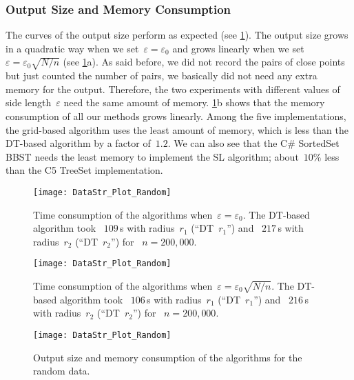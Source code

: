 \subsubsection{Output Size and Memory Consumption}
The curves of the output size perform as expected
(see \fig\ref{fig:DataStr_RandomMemory}). 
The output size grows in a quadratic way
when we set~$\varepsilon =\varepsilon _{0}$ 
and grows linearly 
when we set~$\varepsilon =\varepsilon_{0}\sqrt{N/n}$
(see \fig\ref{fig:DataStr_RandomMemory}a). 
As said before, we did not record 
the pairs of close points 
but just counted the number of pairs, 
we basically did not need any extra memory for the output.
Therefore, the two experiments with different values 
of side length~$\varepsilon$ need the same amount of memory. 
\fig\ref{fig:DataStr_RandomMemory}b 
shows that the memory consumption of all our 
methods grows linearly. 
Among the five implementations, 
the grid-based algorithm uses 
the least amount of memory, 
which is less than the DT-based algorithm 
by a factor of~$1.2$. 
We can also see that the C\# SortedSet BBST needs 
the least memory to implement the SL algorithm; 
about~$10\%$ less than the C5 TreeSet implementation. 


\begin{figure}[tb]	
\centering
\texttt{[image: DataStr\_Plot\_Random]}
\vspace{-3mm}
\caption{Time consumption of the algorithms 
	when~$\varepsilon=\varepsilon_{0}$. 
	The DT-based algorithm took~
	$109\,$s with radius~$r_1$ (``DT~$r_1$'') and~  
	$217\,$s with radius~$r_2$ (``DT~$r_2$'') for~ 
    $n=200,000$.}
\label{fig:DataStr_RandomTimeEpsilonFix}
%
\vspace{5.5mm}
%
\centering
\texttt{[image: DataStr\_Plot\_Random]}
\vspace{-3mm}
\caption{Time consumption of the algorithms
	when~$\varepsilon=\varepsilon_{0} \sqrt{N/n}$. 
	The DT-based algorithm took~ 
	$106\,$s with radius~$r_1$ (``DT~$r_1$'') and~  
	$216\,$s with radius~$r_2$ (``DT~$r_2$'') for~ 
	$n=200{,}000$.}
\label{fig:DataStr_RandomTimeEpsilonDecrease}
%	
\vspace{5.5mm}
%
\centering
\texttt{[image: DataStr\_Plot\_Random]}
\vspace{-3mm}
\caption{Output size and memory consumption 
	of the 	algorithms for the random data.}
\label{fig:DataStr_RandomMemory}	
\end{figure}



